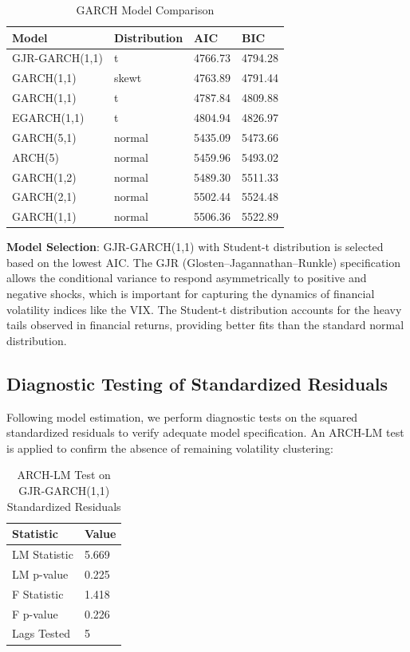\documentclass[letterpaper]{article} %
\begin{document}
\begin{table}[h]
\centering
\caption{GARCH Model Comparison}
\label{tab:garch_models}
\begin{tabular}{llll}
\hline
Model & Distribution & AIC & BIC \\
\hline
GJR-GARCH(1,1) & t & 4766.73 & 4794.28 \\
GARCH(1,1) & skewt & 4763.89 & 4791.44 \\
GARCH(1,1) & t & 4787.84 & 4809.88 \\
EGARCH(1,1) & t & 4804.94 & 4826.97 \\
GARCH(5,1) & normal & 5435.09 & 5473.66 \\
ARCH(5) & normal & 5459.96 & 5493.02 \\
GARCH(1,2) & normal & 5489.30 & 5511.33 \\
GARCH(2,1) & normal & 5502.44 & 5524.48 \\
GARCH(1,1) & normal & 5506.36 & 5522.89 \\
\hline
\end{tabular}
\end{table}

\textbf{Model Selection}: GJR-GARCH(1,1) with Student-t distribution is selected based on the lowest AIC. The GJR (Glosten--Jagannathan--Runkle) specification allows the conditional variance to respond asymmetrically to positive and negative shocks, which is important for capturing the dynamics of financial volatility indices like the VIX. The Student-t distribution accounts for the heavy tails observed in financial returns, providing better fits than the standard normal distribution.

\subsection{Diagnostic Testing of Standardized Residuals}

Following model estimation, we perform diagnostic tests on the squared standardized residuals to verify adequate model specification. An ARCH-LM test is applied to confirm the absence of remaining volatility clustering:

\begin{table}[h]
\centering
\caption{ARCH-LM Test on GJR-GARCH(1,1) Standardized Residuals}
\label{tab:arch_lm_final}
\begin{tabular}{ll}
\hline
Statistic & Value \\
\hline
LM Statistic & 5.669 \\
LM p-value & 0.225 \\
F Statistic & 1.418 \\
F p-value & 0.226 \\
Lags Tested & 5 \\
\hline
\end{tabular}
\end{table}
\end{document}
